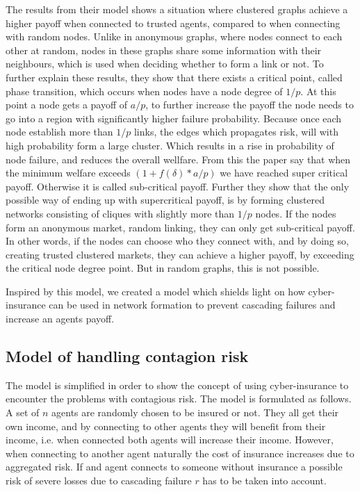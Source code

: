 The results from their model shows a situation where clustered graphs achieve a higher payoff when connected to trusted agents, compared to when connecting with random nodes. Unlike in anonymous graphs, where nodes connect to each other at random, nodes in these graphs share some information with their neighbours, which is used when deciding whether to form a link or not. 
To further explain these results, they show that there exists a critical point, called phase transition, which occurs when nodes have a node degree of $1/p$. 
At this point a node gets a payoff of $a/p$, to further increase the payoff the node needs to go into a region with significantly higher failure probability. 
Because once each node establish more than $1/p$ links, the edges which propagates risk, will with high probability form a large cluster. Which results in a rise in probability of node failure, and reduces the overall wellfare.
From this the paper say that when the minimum welfare exceeds 
$(1+f(\delta)*a/p)
$
we have reached super critical payoff. Otherwise it is called sub-critical payoff. 
Further they show that the only possible way of ending up with supercritical payoff, is by forming clustered networks consisting of cliques with slightly more than $1/p$ nodes. 
If the nodes form an anonymous market, random linking, they can only get sub-critical payoff. 
In other words, if the nodes can choose who they connect with, and by doing so, creating trusted clustered markets, they can achieve a higher payoff, by exceeding the critical node degree point. But in random graphs, this is not possible. 


Inspired by this model, we created a model which shields light on how cyber-insurance can be used in network formation to prevent cascading failures and increase an agents payoff.  

\subsection{Model of handling contagion risk}
The model is simplified in order to show the concept of using cyber-insurance to encounter the problems with contagious risk. The model is formulated as follows. A set of $n$ agents are randomly chosen to be insured or not. They all get their own income, and by connecting to other agents they will benefit from their income, i.e. when connected both agents will increase their income. However, when connecting to another agent naturally the cost of insurance increases due to aggregated risk. If and agent connects to someone without insurance a possible risk of severe losses due to cascading failure $r$ has to be taken into account. 

